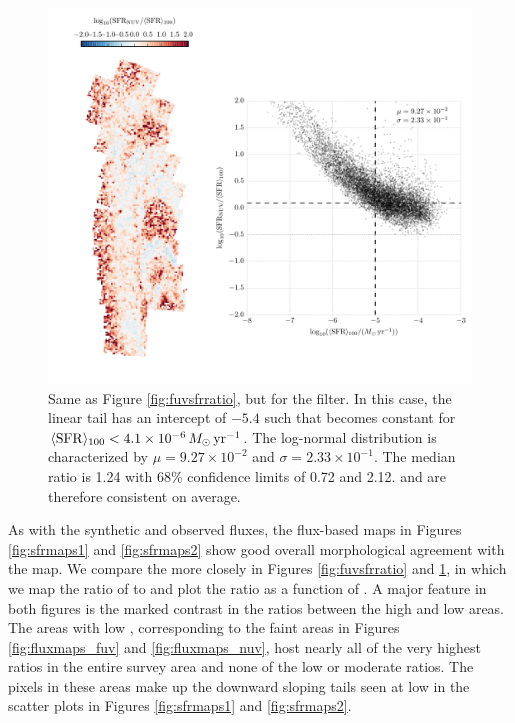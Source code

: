 \documentclass[iop, tighten]{emulateapj}
\begin{document}
\begin{figure}
\centering
\includegraphics[width=\textwidth]{m31flux-figures/sfr_nuv-vs-mean.pdf}
\caption[Ratio of the \sfr{} based on the observed extinction-corrected \nuv{}
flux to the $100\myr$ mean \sfr{}.]{Same as Figure \ref{fig:fuvsfrratio}, but
    for the \nuv{} filter. In this case, the linear tail has an intercept of
    $-5.4$ such that \sfrnuv{} becomes constant for $\langle\mathrm{SFR}\rangle_{100} < 4.1\times
    10^{-6}\,M_\odot\,\mathrm{yr}^{-1}$. The log-normal distribution is characterized by $\mu
    = 9.27\times 10^{-2}$ and $\sigma = 2.33\times 10^{-1}$. The median ratio
    is 1.24 with 68\% confidence limits of 0.72 and 2.12. \sfrnuv{} and
    \sfroneh{} are therefore consistent on average.
}
\label{fig:nuvsfrratio}
\end{figure}


As with the synthetic and observed fluxes, the flux-based \sfr{} maps in
Figures \ref{fig:sfrmaps1} and \ref{fig:sfrmaps2} show good overall
morphological agreement with the \sfroneh{} map. We compare the  more
closely in Figures \ref{fig:fuvsfrratio} and \ref{fig:nuvsfrratio}, in which we
map the ratio of \sfrx{} to \sfroneh{} and plot the \sfr{} ratio as a function
of \sfroneh{}. A major feature in both figures is the marked contrast in the
\sfr{} ratios between the high and low \sfr{} areas. The areas with low
\sfroneh{}, corresponding to the faint areas in Figures \ref{fig:fluxmaps_fuv}
and \ref{fig:fluxmaps_nuv}, host nearly all of the very highest \sfr{} ratios
in the entire survey area and none of the low or moderate ratios. The pixels in
these areas make up the downward sloping tails seen at low \sfroneh{} in the
scatter plots in Figures \ref{fig:sfrmaps1} and \ref{fig:sfrmaps2}.
\end{document}
